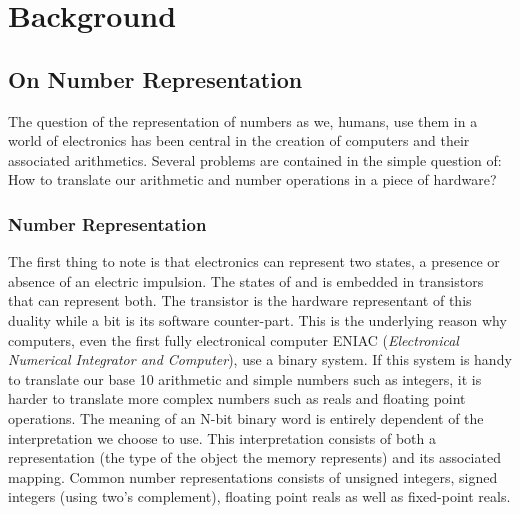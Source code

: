 \chapter{Background} %

\label{Chapter2} %



\section{On Number Representation}

The question of the representation of numbers as we, humans, use them in a world of electronics has been central in the creation of computers and their associated arithmetics. Several problems are contained in the simple question of: How to translate our arithmetic and number operations in a piece of hardware?

\subsection{Number Representation}

The first thing to note is that electronics can represent two states, a presence or absence of an electric impulsion. The states of  and  is embedded in transistors that can represent both. The transistor is the hardware representant of this duality while a bit is its software counter-part. This is the underlying reason why computers, even the first fully electronical computer ENIAC (\emph{Electronical Numerical Integrator and Computer}), use a binary system. If this system is handy to translate our base 10 arithmetic and simple numbers such as integers, it is harder to translate more complex numbers such as reals and floating point operations. The meaning of an N-bit binary word is entirely dependent of the interpretation we choose to use. This interpretation consists of both a representation (the type of the object the memory represents) and its associated mapping. Common number representations consists of unsigned integers, signed integers (using two's complement), floating point reals as well as fixed-point reals.

